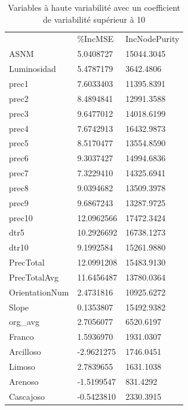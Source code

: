 \begin{table}[H]
	\centering
	\caption{Variables à haute variabilité avec un coefficient de variabilité supérieur à 10}
	\label{tab:variability10Variables}
	\begin{tabular}{lll}
		& \%IncMSE   & IncNodePurity \\
		ASNM           & 5.0408727  & 15044.3045    \\
		Luminosidad    & 5.4787179  & 3642.4806     \\
		prec1          & 7.6033403  & 11395.8391    \\
		prec2          & 8.4894841  & 12991.3588    \\
		prec3          & 9.6477012  & 14018.6199    \\
		prec4          & 7.6742913  & 16432.9873    \\
		prec5          & 8.5170477  & 13554.8590    \\
		prec6          & 9.3037427  & 14994.6836    \\
		prec7          & 7.3229410  & 14325.6941    \\
		prec8          & 9.0394682  & 13509.3978    \\
		prec9          & 9.6867243  & 13287.9725    \\
		prec10         & 12.0962566 & 17472.3424    \\
		dtr5           & 10.2926692 & 16738.1273    \\
		dtr10          & 9.1992584  & 15261.9880    \\
		PrecTotal      & 12.0991208 & 15483.9130    \\
		PrecTotalAvg   & 11.6456487 & 13780.0364    \\
		OrientationNum & 2.4731816  & 10925.6272    \\
		Slope          & 0.1353807  & 15492.9382    \\
		org\_avg       & 2.7056077  & 6520.6197     \\
		Franco         & 1.5936970  & 1931.0307     \\
		Arcilloso      & -2.9621275 & 1746.0451     \\
		Limoso         & 2.7839655  & 1631.1038     \\
		Arenoso        & -1.5199547 & 831.4292      \\
		Cascajoso      & -0.5423810 & 2330.3915    
	\end{tabular}
\end{table}














